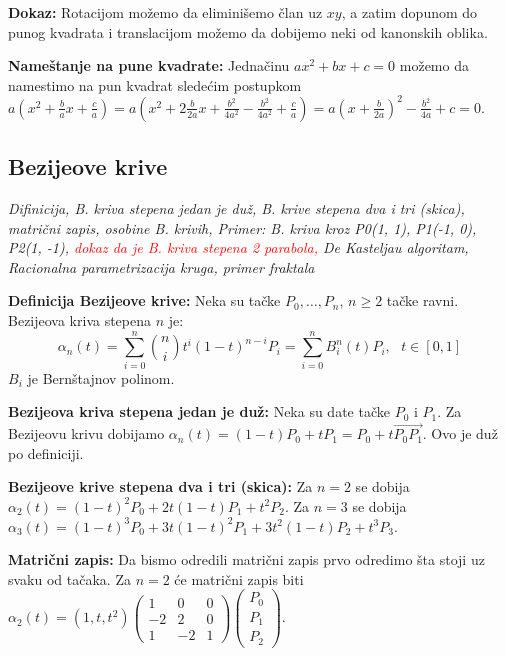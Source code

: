\documentclass[12pt]{article}
\newcommand{\vek}[1]{\overrightarrow{#1}}
\newcommand{\ocena}[1]{\textcolor{red}{#1}}
\begin{document}
\textbf{Dokaz:} Rotacijom možemo da eliminišemo član uz $xy$, a zatim dopunom
do punog kvadrata i translacijom možemo da dobijemo neki od kanonskih oblika.
\par

\textbf{Nameštanje na pune kvadrate:} Jednačinu $ax^2+bx+c=0$ možemo da
namestimo na pun kvadrat sledećim postupkom
$a(x^2+\frac{b}{a}x+\frac{c}{a})=a(x^2+2\frac{b}{2a}x+\frac{b^2}{4a^2}-\frac{b^2}{4a^2}+\frac{c}{a})
    =a(x+\frac{b}{2a})^2-\frac{b^2}{4a}+c=0$.

\subsection{Bezijeove krive}
\textit{Difinicija, B. kriva stepena jedan je duž, B. krive stepena dva i tri
    (skica), matrični zapis, osobine B. krivih, Primer: B. kriva kroz P0(1, 1),
    P1(-1, 0), P2(1, -1), \ocena{dokaz da je B. kriva stepena 2 parabola,} De Kasteljau
    algoritam, Racionalna parametrizacija kruga, primer fraktala}
\par
\vspace*{1cm}

\textbf{Definicija Bezijeove krive:} Neka su tačke $P_0,\dotsc,P_n$, $n\geq2$
tačke ravni. Bezijeova kriva stepena $n$ je:
$$\alpha_n(t)=\sum_{i=0}^{n}\binom{n}{i}t^i(1-t)^{n-i}P_i=\sum_{i=0}^{n}
    B^n_i(t)P_i,\text{\ }t\in[0,1]$$
$B_i$ je Bernštajnov polinom.
\par

\textbf{Bezijeova kriva stepena jedan je duž:} Neka su date tačke $P_0$ i
$P_1$. Za Bezijeovu krivu dobijamo
$\alpha_n(t)=(1-t)P_0+tP_1=P_0+t\vek{P_0P_1}$. Ovo je duž po definiciji.
\par

\textbf{Bezijeove krive stepena dva i tri (skica):} Za $n=2$ se dobija
$\alpha_2(t)=(1-t)^2P_0+2t(1-t)P_1+t^2P_2$. Za $n=3$ se dobija
$\alpha_3(t)=(1-t)^3P_0+3t(1-t)^2P_1+3t^2(1-t)P_2+t^3P_3$.
\par

\textbf{Matrični zapis:} Da bismo odredili matrični zapis prvo odredimo šta
stoji uz svaku od tačaka. Za $n=2$ će matrični zapis biti
$\alpha_2(t)=\left(1,t,t^2\right)\left(\begin{matrix}
            1  & 0  & 0 \\
            -2 & 2  & 0 \\
            1  & -2 & 1
        \end{matrix}\right)\left(\begin{matrix}
            P_0 \\
            P_1 \\
            P_2
        \end{matrix}\right)$.
\par
\end{document}
